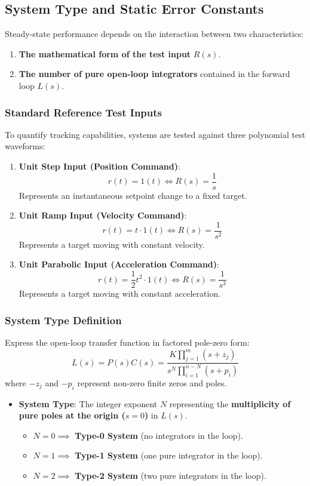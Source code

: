 \documentclass[12pt,onecolumn,twoside ]{article}
\begin{document}
	\subsection{System Type and Static Error Constants}
	Steady-state performance depends on the interaction between two characteristics:
	\begin{enumerate}
		\item
		\textbf{The mathematical form of the test input} $R(s)$.
		\item
		\textbf{The number of pure open-loop integrators} contained in the forward loop $L(s)$.
	\end{enumerate}
	\subsubsection{Standard Reference Test Inputs}
	To quantify tracking capabilities, systems are tested against three polynomial test waveforms:
	\begin{enumerate}
		\item
		\textbf{Unit Step Input (Position Command)}: \[
		r(t) = 1(t) \iff R(s) = \frac{1}{s}
		\] Represents an instantaneous setpoint change to a fixed target.
		\item
		\textbf{Unit Ramp Input (Velocity Command)}: \[
		r(t) = t \cdot 1(t) \iff R(s) = \frac{1}{s^2}
		\] Represents a target moving with constant velocity.
		\item
		\textbf{Unit Parabolic Input (Acceleration Command)}: \[
		r(t) = \frac{1}{2}t^2 \cdot 1(t) \iff R(s) = \frac{1}{s^3}
		\] Represents a target moving with constant acceleration.
	\end{enumerate}
	\subsubsection{System Type Definition}
	Express the open-loop transfer function in factored pole-zero form: \[
	L(s) = P(s)C(s) = \frac{K \prod_{j=1}^{m} (s + z_j)}{s^N \prod_{i=1}^{n-N} (s + p_i)}
	\] where $-z_j$ and $-p_i$ represent non-zero finite zeros and poles.
	\begin{itemize}
		\item
		\textbf{System Type}: The integer exponent $N$ representing the \textbf{multiplicity of pure poles at the origin ($s = 0$)} in $L(s)$.
		\begin{itemize}
			\item
			$N = 0 \implies$ \textbf{Type-0 System} (no integrators in the loop).
			\item
			$N = 1 \implies$ \textbf{Type-1 System} (one pure integrator in the loop).
			\item
			$N = 2 \implies$ \textbf{Type-2 System} (two pure integrators in the loop).
		\end{itemize}
	\end{itemize}
	
\end{document}
